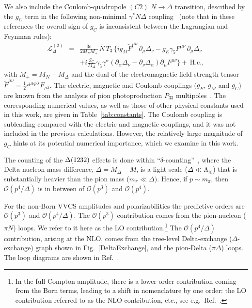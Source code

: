 \documentclass[12pt,preprint,tightenlines,
showpacs,preprintnumbers,amsmath,amssymb,
a4paper,nofootinbib]{revtex4-2}
\def\bea{\begin{eqnarray}}
\def\eea{\end{eqnarray}}
\def\eqlab#1{\label{eq:#1}}
\def\nn{\nonumber}
\begin{document}
We also include the Coulomb-quadrupole $(C2)$ $N\to \Delta$ transition,
described by the $g_C$ term in the following non-minimal $\gamma^* N \Delta$ coupling~\cite{Pascalutsa:2005vq,Pascalutsa:2005ts}
(note that in these references the overall sign of $g_C$ is inconsistent between the Lagrangian and Feynman rules):
\bea
\mathcal{L}^{(2)}_\Delta &=&  \frac{3e}{2M_N M_+}\,\overline N\, T_3\,\Big\{
i g_M  \tilde F^{\mu\nu} \,\partial_{\mu}\Delta_\nu- g_E \gamma_5 F^{\mu\nu}\,\partial_{\mu}\Delta_\nu\eqlab{gammaNDeltaLag}\\
&& +i \frac{g_C}{M_\Delta}\gamma_5 \gamma^\alpha (\partial_\alpha \Delta_\nu-\partial_\nu \Delta_\alpha)\partial_\mu F^{\mu \nu}\Big\}+\,\mbox{H.c.},
\nn
\eea
with $M_+=M_N+M_\Delta$ and the dual of the electromagnetic field strength tensor
 $\tilde F^{\mu\nu}=\frac{1}{2}\epsilon^{\mu\nu\rho\lambda}F_{\rho\lambda}$.
The electric, magnetic and Coulomb couplings ($g_E$, $g_M$ and $g_C$)
are known from the analysis of pion photoproduction $P_{33}$ multipoles~\cite{Pascalutsa:2005ts}.
The corresponding numerical values, as well as those of other physical constants used in this work, are given in Table~\ref{tab:constants}. The Coulomb coupling is subleading
compared with the electric and magnetic couplings, and it was not included in the previous calculations.
However, the relatively large magnitude of $g_C$ hints at its potential numerical importance,
which we examine in this work.






The counting of the $\Delta(1232)$ effects is done within  ``$\delta$-counting''~\cite{Pascalutsa:2003aa}, where the Delta-nucleon mass difference,
$\varDelta=M_\Delta-M$, is a light scale ($\varDelta \ll {\Lambda}_\chi$) that is
substantially heavier than the pion mass ($m_\pi\ll\varDelta)$. Hence, if $p\sim m_\pi$, 
then $\mathcal{O}(p^4/\varDelta)$ is in between of $\mathcal{O}(p^3)$ and $\mathcal{O}(p^4)$. 


For the non-Born VVCS amplitudes
and polarizabilities the predictive orders are $\mathcal{O}(p^3)$ and $\mathcal{O}(p^4/\varDelta)$.
The $\mathcal{O}(p^3)$ contribution comes from the pion-nucleon ($\pi N$) loops.
We refer to it here as the LO contribution.\footnote{In the full Compton amplitude, there is a lower order contribution coming from the Born terms, leading to a shift in nomenclature by one order: the LO contribution referred to as the NLO contribution, etc., see e.g.~Ref.~\cite{Lensky:2009uv}. }
The $\mathcal{O}(p^4/\varDelta)$ contribution, arising at the NLO, 
comes from the tree-level Delta-exchange ($\Delta$-exchange) graph shown in  Fig.~\ref{DeltaExchange}, and the pion-Delta ($\pi \Delta$) loops. The loop diagrams are shown in Ref.~\cite[Figs.~1 and 2]{Lensky:2014dda}.
\end{document}

